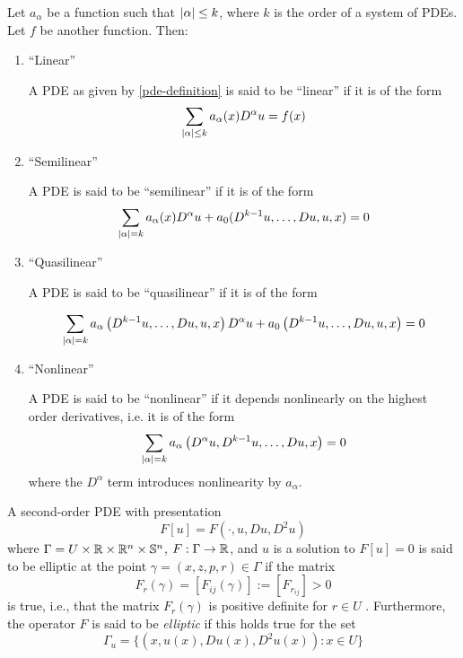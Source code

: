 \begin{definition}
    Let $a_{\alpha}$ be a function such that $\abs{\alpha} \le k$, where $k$ is the order of a system of PDEs. 
    Let $f$ be another function. Then:
    \begin{enumerate}
        \item ``Linear''
        
        A PDE as given by \eqref{pde-definition} is said to be ``linear'' if it is of the form
        $$\sum_{\abs{\alpha} \le k} a_{\alpha}(x) D^{\alpha} u = f(x)$$
        \item ``Semilinear''
        
        A PDE is said to be ``semilinear'' if it is of the form
        $$\sum_{\abs{\alpha} = k} a_{\alpha}(x) D^{\alpha} u + a_0(D^{k-1}u, \dots, Du, u, x) = 0$$
        \item ``Quasilinear''
        
        A PDE is said to be ``quasilinear'' if it is of the form 

        $$\sum_{\abs{\alpha} = k} a_{\alpha} \left ( D^{k-1} u, \dots, Du, u, x \right ) D^{\alpha} u + a_0 \left ( D^{k-1} u, \dots, Du, u, x \right ) = 0$$
        \item ``Nonlinear''
        
        A PDE is said to be ``nonlinear'' if it depends nonlinearly on the highest 
        order derivatives, i.e. it is of the form
        $$\sum_{\abs{\alpha} = k} a_{\alpha} \left ( D^{\alpha} u, D^{k-1} u, \dots, Du, x \right ) = 0$$  
        where the $D^{\alpha}$ term introduces nonlinearity by $a_{\alpha}$.
    \end{enumerate}
    
\end{definition}

\begin{definition}
    A second-order PDE with presentation
    $$F[u] = F(\cdot, u, Du, D^2 u)$$
    where $\Gamma = U \times \mathbb{R} \times \mathbb{R}^n \times \mathbb{S}^n$, $F:\Gamma \to \mathbb{R}$, and $u$ is a solution to $F[u] = 0$ is said to be elliptic at 
    the point $\gamma = (x,z,p,r) \in \Gamma$ if the matrix
    $$F_{r}(\gamma) = \left [ F_{ij} (\gamma) \right ] := \left [ F_{r_{ij}} \right ] > 0$$ 
    is true, i.e., that the matrix $F_{r}(\gamma)$ is positive definite for $r \in U$ \cite{trudinger-nonlinear-pde-lecture}. 
    Furthermore, the operator $F$ is said to be \textit{elliptic} if this holds true for the set
    $$\Gamma_u = \lbrace (x, u(x), Du(x), D^2 u(x)) : x \in U \rbrace$$
\end{definition}

